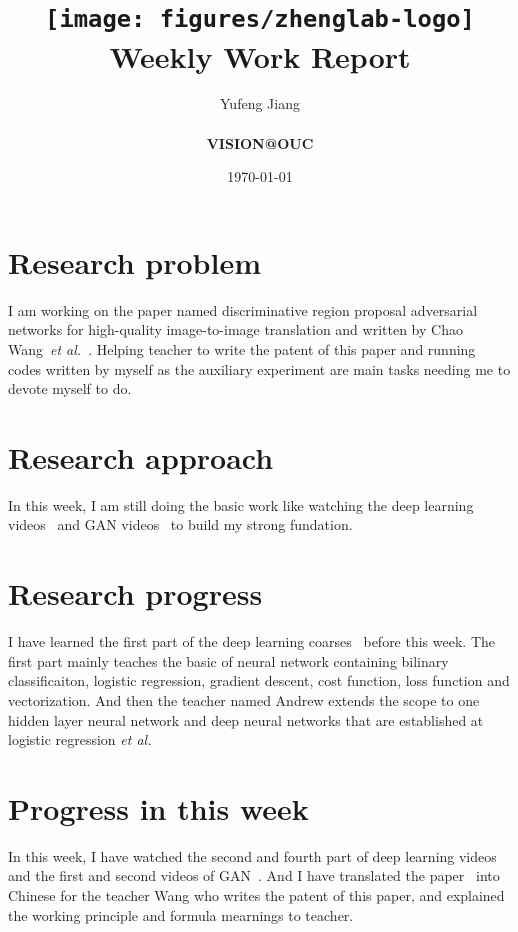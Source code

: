 \documentclass[a4paper]{article}
\title{
    \vspace*{1in}
    \texttt{[image: figures/zhenglab-logo]} \\
    \vspace*{1.2in}
    \textbf{\huge Weekly Work Report}
    \vspace{0.2in}
}
\author{Yufeng Jiang \\
    \vspace*{0.5in} \\
    \textbf{VISION@OUC} \\
    \vspace*{1in}
}
\date{\today}
\begin{document}
\maketitle
\setcounter{page}{0}
\thispagestyle{empty}
\newpage

\section{Research problem}

I am working on the paper named discriminative region proposal adversarial networks for high-quality image-to-image translation and written by Chao Wang~\emph{et al.}~\cite{dis}. Helping teacher to write the patent of this paper and running codes written by myself as the auxiliary experiment are main tasks needing me to devote myself to do.

\section{Research approach}

In this week, I am still doing the basic work like watching the deep learning videos~\cite{Neural} and GAN videos~\cite{bilibili} to build my strong fundation.

\section{Research progress}

I have learned the first part of the deep learning coarses~\cite{Neural} before this week. The first part mainly teaches the basic of neural network containing bilinary classificaiton, logistic regression, gradient descent, cost function, loss function and vectorization. And then the teacher named Andrew extends the scope to one hidden layer neural network and deep neural networks that are established at logistic regression \emph{et al.} 

\section{Progress in this week}

In this week, I have watched the second and fourth part of deep learning videos~\cite{Neural} and the first and second videos of GAN~\cite{bilibili}. And I have translated the paper~\cite{dis} into Chinese for the teacher Wang who writes the patent of this paper, and explained the working principle and formula mearnings to teacher.
\end{document}
